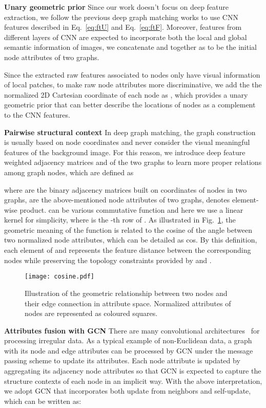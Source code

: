 \documentclass[final]{cvpr}
\begin{document}
{\bf{Unary geometric prior} }
Since our work doesn't focus on deep feature extraction, we follow the previous deep graph matching works to use CNN features described in Eq.~\eqref{eq:ftU} and Eq.~\eqref{eq:ftF}. Moreover, features from different layers of CNN are expected to incorporate both the local and global semantic information of images, we concatenate  and  together as  to be the initial node attributes of two graphs.

Since the extracted raw features associated to nodes only have visual information of local patches, to make raw node attributes more discriminative, we add the the normalized 2D Cartesian coordinate  of each node as , which provides a unary geometric prior that can better describe the locations of nodes as a complement to the CNN features.

{\bf{Pairwise structural context} }
In deep graph matching, the graph construction is usually based on node coordinates and never consider the visual meaningful features of the background image. For this reason, we introduce deep feature weighted adjacency matrices  and  of the two graphs to learn more proper relations among graph nodes, which are defined as

where  are the binary adjacency matrices built on coordinates of nodes in two graphs,   are the above-mentioned node attributes of two graphs,  denotes element-wise product.  can be various commutative function and here we use a linear kernel  for simplicity, where  is the -th row of . As illustrated in Fig.~\ref{fig:cosine}, the geometric meaning of the function  is related to the cosine of the angle between two normalized node attributes, which can be detailed as cos. By this definition, each element of  and  represents the feature distance between the corresponding nodes while preserving the topology constraints provided by  and .
\begin{figure}[t]
\centering
   \texttt{[image: cosine.pdf]}
   \caption{Illustration of the geometric relationship between two nodes and their edge connection in attribute space. Normalized attributes of nodes are represented as coloured squares.}
\label{fig:cosine}
\vspace{-3mm}
\end{figure}

{\textbf{Attributes fusion with GCN} }
There are many convolutional architectures~\cite{fey2018splinecnn,zhou2018graph} for processing irregular data. As a typical example of non-Euclidean data, a graph with its node and edge attributes can be processed by GCN under the message passing scheme to update its attributes. Each node attribute is updated by aggregating its adjacency node attributes so that GCN is expected to capture the structure contexts of each node in an implicit way. With the above interpretation, we adopt GCN that incorporates both update from neighbors and self-update, which can be written as:
\end{document}
